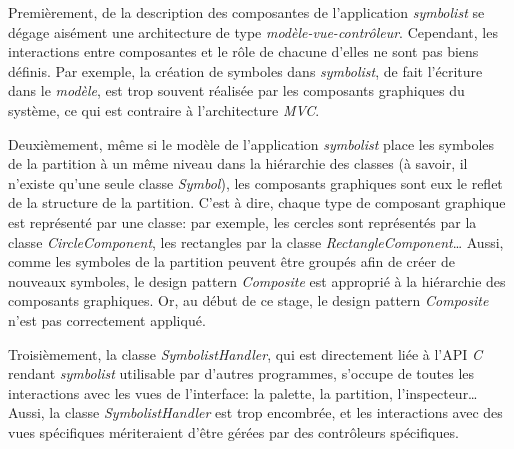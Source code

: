Premièrement, de la description des composantes de l'application \textit{symbolist} se dégage aisément une architecture de type \textit{modèle-vue-contrôleur}. Cependant, les interactions entre composantes et le rôle de chacune d'elles ne sont pas biens définis. Par exemple, la création de symboles dans \textit{symbolist}, de fait l'écriture dans le \textit{modèle}, est trop souvent réalisée par les composants graphiques du système, ce qui est contraire à l'architecture \textit{MVC}. 

Deuxièmement, même si le modèle de l'application \textit{symbolist} place les symboles de la partition à un même niveau dans la hiérarchie des classes (à savoir, il n'existe qu'une seule classe \textit{Symbol}), les composants graphiques sont eux le reflet de la structure de la partition.
C'est à dire, chaque type de composant graphique est représenté par une classe: par exemple, les cercles sont représentés par la classe \textit{CircleComponent}, les rectangles par la classe \textit{RectangleComponent}…
Aussi, comme les symboles de la partition peuvent être groupés afin de créer de nouveaux symboles, le design pattern \textit{Composite} est approprié à la hiérarchie des composants graphiques. 
Or, au début de ce stage, le design pattern \textit{Composite} n'est pas correctement appliqué. 

Troisièmement, la classe \textit{SymbolistHandler}, qui est directement liée à l'API \textit{C} rendant \textit{symbolist} utilisable par d'autres programmes, s'occupe de toutes les interactions avec les vues de l'interface: la palette, la partition, l'inspecteur… Aussi, la classe \textit{SymbolistHandler} est trop encombrée, et les interactions avec des vues spécifiques mériteraient d'être gérées par des contrôleurs spécifiques.   

  